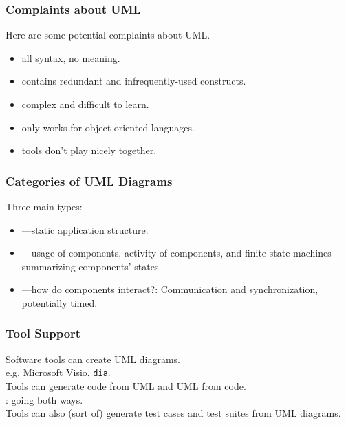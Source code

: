 \begin{frame}
\frametitle{Complaints about UML}

\begin{changemargin}{1cm}
Here are some potential complaints about UML.
\begin{itemize}
\item all syntax, no meaning.
\item contains redundant and infrequently-used constructs.
\item complex and difficult to learn.
\item only works for object-oriented languages.
\item tools don't play nicely together.
\end{itemize}
\end{changemargin}
\end{frame}

\begin{frame}
\frametitle{Categories of UML Diagrams}

\begin{changemargin}{1cm}
Three main types:
\begin{itemize}
\item {}---static application structure.


\item {}---usage of components,
 activity of components, and finite-state machines summarizing components'
states.


\item {}---how do components interact?:
  Communication and synchronization, potentially timed.  

\end{itemize}
\end{changemargin}
\end{frame}

\begin{frame}
\frametitle{Tool Support}

\begin{changemargin}{1cm}
Software tools can create UML diagrams.\\
\qquad e.g. Microsoft Visio, {\tt dia}.\\[1em]

Tools can generate
code from UML and UML from code.\\
: going both ways.\\[1em]

Tools can also (sort of) generate test cases and test suites from UML
diagrams.
\end{changemargin}
\end{frame}


